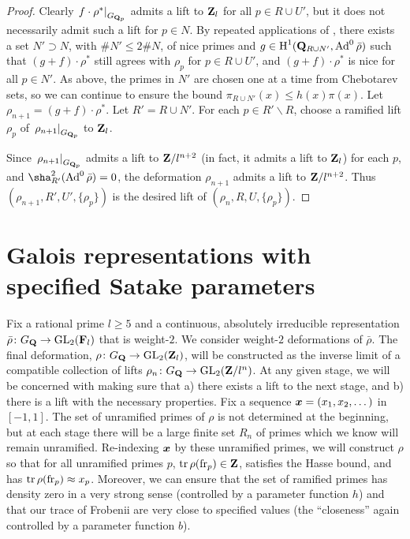 \begin{proof}
Clearly $\left. f\cdot \rho^\ast\right|_{G_{\mathbf{Q}_p}}$ admits a lift to $\mathbf{Z}_l$ 
for all $p\in R\cup U'$, but it does not necessarily admit such a lift for 
$p\in N$. By repeated applications of \cite[Prop.~3.10]{pande-2011}, there 
exists a set $N'\supset N$, with $\# N'\leqslant 2\# N$, of nice primes and 
$g\in \operatorname{H}^1(\mathbf{Q}_{R\cup N'},\operatorname{Ad}^0\bar\rho)$ such that 
$(g+f)\cdot \rho^\ast$ still agrees with $\rho_p$ for $p\in R\cup U'$, and 
$(g+f)\cdot \rho^\ast$ is nice for all $p\in N'$. As above, the primes in $N'$ 
are chosen one at a time from Chebotarev sets, so we can continue to ensure the 
bound $\pi_{R\cup N'}(x)\leqslant h(x) \pi(x)$. Let 
$\rho_{n+1} = (g+f) \cdot \rho^\ast$. Let $R' = R\cup N'$. For each 
$p\in R'\smallsetminus R$, choose a ramified lift $\rho_p$ of 
$\left. \rho_{n+1}\right|_{G_{\mathbf{Q}_p}}$ to $\mathbf{Z}_l$. 

Since $\left.\rho_{n+1}\right|_{G_{\mathbf{Q}_p}}$ admits a lift to $\mathbf{Z}/l^{n+2}$ (in 
fact, it admits a lift to $\mathbf{Z}_l$) for each $p$, and 
$\sha_{R'}^2(\Ad^0\bar\rho) = 0$, the deformation $\rho_{n+1}$ admits a lift to 
$\mathbf{Z}/l^{n+2}$. Thus $(\rho_{n+1},R',U',\{\rho_p\})$ is the desired lift of 
$(\rho_n,R,U,\{\rho_p\})$. 
\end{proof}





\section{Galois representations with specified Satake parameters}

Fix a rational prime $l\geqslant 5$ and a continuous, absolutely irreducible 
representation $\bar\rho\colon G_{\mathbf{Q}} \to \operatorname{GL}_2(\mathbf{F}_l)$ that is weight-$2$. We 
consider weight-$2$ deformations of $\bar\rho$. The final deformation, 
$\rho\colon G_{\mathbf{Q}} \to \operatorname{GL}_2(\mathbf{Z}_l)$, will be constructed as the inverse limit 
of a compatible collection of lifts $\rho_n\colon G_{\mathbf{Q}} \to \operatorname{GL}_2(\mathbf{Z}/l^n)$. At 
any given stage, we will be concerned with making sure that a) there exists a 
lift to the next stage, and b) there is a lift with the necessary properties. 
Fix a sequence ${\boldsymbol x}=(x_1,x_2,\dots)$ in $[-1,1]$. The set of unramified primes 
of $\rho$ is not determined at the beginning, but at each stage there will be 
a large finite set $R_n$ of primes which we know will remain unramified. 
Re-indexing ${\boldsymbol x}$ by these unramified primes, we will construct $\rho$ so that 
for all unramified primes $p$, $\operatorname{tr}\rho(\mathrm{fr}_p)\in \mathbf{Z}$, satisfies the Hasse 
bound, and has $\operatorname{tr}\rho(\mathrm{fr}_p) \approx x_p$. Moreover, we can ensure that the 
set of ramified primes has density zero in a very strong sense (controlled by a 
parameter function $h$) and that our trace of Frobenii are very close to 
specified values (the ``closeness'' again controlled by a parameter function 
$b$). 

